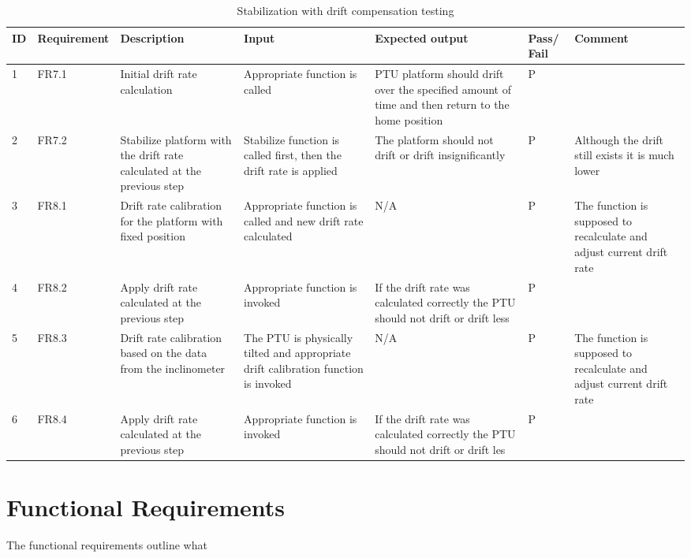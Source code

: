 \begin{landscape}
\begin{center}
\begin{table}[h]

\begin{tabular}{|p{0.3cm}|p{2cm}|p{4cm}|p{4cm}|p{5.4cm}|p{0.9cm}|p{4cm}|}
\hline
ID &  Requirement & Description &  Input &  Expected output & Pass/ Fail & Comment  \\ \hline
1& FR7.1& Initial drift rate calculation& Appropriate function is called &  PTU platform should drift over the specified amount of time and then return to the home position& P &  \\ \hline
2& FR7.2& Stabilize platform with the drift rate calculated at the previous step& Stabilize function is called first, then the drift rate is applied& The platform should not drift or drift insignificantly& P& Although the drift still exists it is much lower  \\ \hline
3& FR8.1& Drift rate calibration for the platform with fixed position& Appropriate function is called and new drift rate calculated& N/A& P & The function is supposed to recalculate and adjust current drift rate \\ \hline
4& FR8.2& Apply drift rate calculated at the previous step& Appropriate function is invoked& If the drift rate was calculated correctly the PTU should not drift or drift less& P & \\ \hline
5& FR8.3& Drift rate calibration based on the data from the inclinometer& The PTU is physically tilted and appropriate drift calibration function is invoked& N/A& P& The function is supposed to recalculate and adjust current drift rate\\ \hline 
6& FR8.4& Apply drift rate calculated at the previous step& Appropriate function is invoked& If the drift rate was calculated correctly the PTU should not drift or drift les& P & \\ \hline

\end{tabular}
\caption {Stabilization with drift compensation testing} \label{tab:Stabilization_with_drift_compensation_testing}
\end{table}
\end{center}
\end{landscape}

\section{Functional Requirements}
The functional requirements outline what
